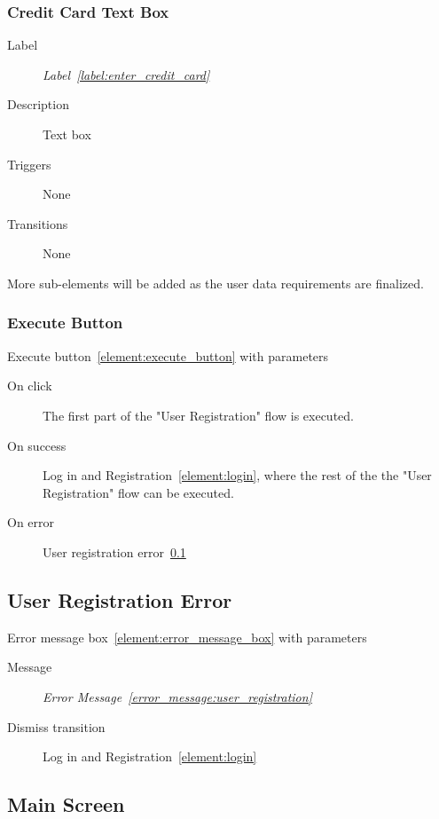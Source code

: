 \documentclass[a4paper,10pt]{article}
\newcommand{\errorMessageLabelText}{Error Message}
\newcommand{\errorMessageLabel}{error_message:}
\DeclareRobustCommand{\errorMessageTextRef}[1]{%
   \emph{\errorMessageLabelText~\ref{\errorMessageLabel#1}}}
\newcommand{\labelLabelText}{Label}
\newcommand{\labelLabel}{label:}
\DeclareRobustCommand{\labelRef}[1]{%
   \emph{\labelLabelText~\ref{\labelLabel#1}}}
\newcommand{\elementLabel}{element:}
\DeclareRobustCommand{\element}[2]{\subsection{#1}\label{\elementLabel#2}}
\DeclareRobustCommand{\elementRef}[1]{\ref{\elementLabel#1}}
\begin{document}
\subsubsection{Credit Card Text Box}
\begin{description}
 \item[Label] \labelRef{enter_credit_card}
 \item[Description] Text box
 \item[Triggers] None
 \item[Transitions] None
\end{description}

More sub-elements will be added as the user data requirements are finalized.

\subsubsection{Execute Button}
Execute button~\elementRef{execute_button} with parameters
\begin{description}
 \item[On click] The first part of the "User Registration" flow is executed.
 \item[On success] Log in and Registration~\elementRef{login}, where the rest 
of the the "User Registration" flow can be executed.
 \item[On error] User registration 
error~\elementRef{user_registration_error}
\end{description}

\element{User Registration Error}{user_registration_error}

Error message box~\elementRef{error_message_box} with parameters
\begin{description}
 \item[Message] \errorMessageTextRef{user_registration}
 \item[Dismiss transition] Log in and Registration~\elementRef{login}
\end{description}

\element{Main Screen}{main_screen}
\end{document}
